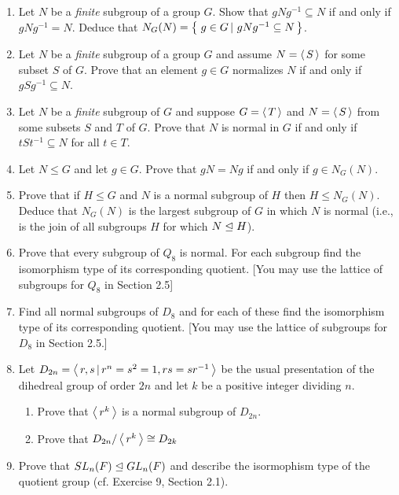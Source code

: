 \documentclass[10pt,a4paper]{report}
\begin{document}
\begin{enumerate}
	\item Let $N$ be a \textit{finite} subgroup of a group $G$.  Show that $gNg^{-1} \subseteq N$ if and only if $gNg^{-1}=N$.  Deduce that $N_G(N)=\left \{\, \left . g\in G \, \right |\,gNg^{-1}\subseteq N \,\right \}$.
	
	\item Let $N$ be a \textit{finite} subgroup of a group $G$ and assume $N = \left \langle\, S \,\right \rangle$ for some subset $S$ of $G$.  Prove that an element $g\in G$ normalizes $N$ if and only if $gSg^{-1} \subseteq N$.
	
	\item Let $N$ be a \textit{finite} subgroup of $G$ and suppose $G = \left \langle\, T \,\right \rangle$ and $N=\left \langle\, S \,\right \rangle$ from some subsets $S$ and $T$ of $G$.  Prove that $N$ is normal in $G$ if and only if $tSt^{-1}\subseteq N$ for all $t \in T$.
	
	\item Let $N \le G$ and let $g\in G$.  Prove that $gN=Ng$ if and only if $g\in N_G(N)$.
	
	\item Prove that if $H \le G$ and $N$ is a normal subgroup of $H$ then $H \le N_G(N)$.  Deduce that $N_G(N)$ is the largest subgroup of $G$ in which $N$ is normal (i.e., is the join of all subgroups $H$ for which $N \trianglelefteq H$).
	
	\item Prove that every subgroup of $Q_8$ is normal.  For each subgroup find the isomorphism type of its corresponding quotient.  [You may use the lattice of subgroups for $Q_8$ in Section 2.5]
	
	\item Find all normal subgroups of $D_8$ and for each of these find the isomorphism type of its corresponding quotient.  [You may use the lattice of subgroups for $D_8$ in Section 2.5.]
	
	\item Let $D_{2n}=\left \langle\, r,s\,|\,r^n=s^2=1, rs=sr^{-1} \,\right \rangle$ be the usual presentation of the dihedreal group of order $2n$ and let $k$ be  a positive integer dividing $n$.
	\begin{enumerate}
		\item Prove that $\left \langle\, r^k \,\right \rangle$ is a normal subgroup of $D_{2n}$.
		\item Prove that $D_{2n}/\left \langle\, r^k \,\right \rangle \cong D_{2k}$
	\end{enumerate}
	
	\item Prove that $SL_n(F) \trianglelefteq GL_n(F)$ and describe the isormophism type of the quotient group (cf.  Exercise 9, Section 2.1).
	

\end{enumerate}
\end{document}
